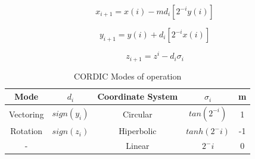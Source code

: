 \begin{equation} 
x_{i+1} = x(i) - m d_i[2^{-i}y(i)]
    \label{eq:cordic2_x}
\end{equation}

\begin{equation} 
y_{i+1} = y(i) + d_i[2^{-i}x(i)]
	\label{eq:cordic2_y}
\end{equation}

\begin{equation} 
z_{i+1} = z^{i} - d_i\sigma_{i}
    \label{eq:cordic2_z}
\end{equation}

\begin{table}[h]
\centering
\caption{CORDIC Modes of operation}
\label{table:cordic_modes}
\begin{tabular}{ccccc}
\hline
Mode      & $d_{i}$       & Coordinate System & $\sigma_{i}$  & m  \\ \hline
Vectoring & $sign(y_{i})$ & Circular          & $tan(2^{-i})$ & 1  \\
Rotation  & $sign(z_{i})$ & Hiperbolic        & $tanh(2^-i)$  & -1 \\
-         &               & Linear            & $2^-i$        & 0 \\ \hline
\end{tabular}
\end{table}


